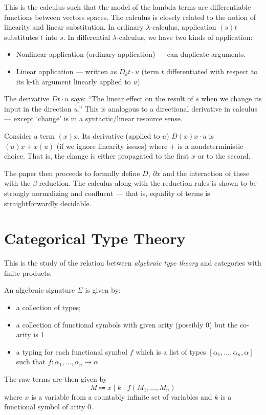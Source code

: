 \documentclass[acmsmall,screen, nonacm, anonymous]{acmart}
\begin{document}
This is the calculus such that the model of the lambda terms are differentiable functions between vectors spaces.
The calculus is closely related to the notion of linearity and linear substitution.
In ordinary $\lambda$-calculus, application $(s) t$ substitutes $t$ into $s$.
In differential $\lambda$-calculus, we have two kinds of application:
\begin{itemize}

\item Nonlinear application (ordinary application) --- can duplicate arguments.

\item Linear application --- written as $D_{k} t \cdot u$ (term $t$ differentiated with respect to its k-th argument linearly applied to $u$)

\end{itemize}
The derivative $D t \cdot u$ says: \enquote{The linear effect on the result of $s$ when we change its input in the direction $u$.}
This is analogous to a directional derivative in calculus --- except `change' is in a syntactic/linear resource sense.

\begin{example}
Consider a term $(x) x$.
Its derivative (applied to $u$) $D (x) x \cdot u$ is $(u) x + x (u)$ (if we ignore linearity issues) where $+$ is a nondeterministic choice.
That is, the change is either propagated to the first $x$ or to the second.
\end{example}

The paper then proceeds to formally define $D$, $\partial x$ and the interaction of these with the $\beta$-reduction.
The calculus along with the reduction rules is shown to be strongly normalizing and confluent --- that is, equality of terms is straightforwardly decidable.

\section{Categorical Type Theory}

This is the study of the relation between \textit{algebraic type theory} and categories with finite products.

\begin{definition}

An algebraic signature $\Sigma$ is given by:
\begin{itemize}

\item a collection of types;
\item a collection of functional symbols with given arity (possibly 0) but the co-arity is 1
\item a typing for each functional symbol $f$ which is a list of types $[\alpha_1, \ldots, \alpha_n, \alpha]$ such that $f : \alpha_1, \ldots, \alpha_{n} \to \alpha$
\end{itemize}

The raw terms are then given by
\[
 M \Coloneqq x \;|\; k \;|\; f(M_1, \ldots, M_{n})
\]
where $x$ is a variable from a countably infinite set of variables and $k$ is a functional symbol of arity 0.
\end{definition}
\end{document}
